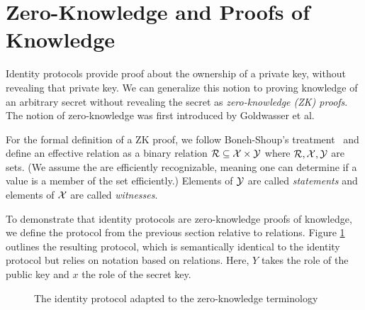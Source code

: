 \section{Zero-Knowledge and Proofs of Knowledge}
\label{sec:zknowledge}
Identity protocols provide proof about the ownership of a private key, without revealing that private key.
We can generalize this notion to proving knowledge of an arbitrary secret without revealing the secret as \emph{zero-knowledge (ZK) proofs}. 
The notion of zero-knowledge was first introduced by Goldwasser et al.~\cite{goldwasser1989knowledge}

For the formal definition of a ZK proof, we follow Boneh-Shoup's treatment~\cite{BonehShoupBook} and define an effective relation as a binary relation ${\cal R} \subseteq {\cal X} \times {\cal Y}$  where ${\cal R}, {\cal X},{\cal Y}$ are sets.
(We assume the are efficiently recognizable, meaning one can determine if a value is a member of the set efficiently.)
Elements of ${\cal Y}$ are called \emph{statements} and elements of ${\cal X}$ are called \emph{witnesses}.

To demonstrate that identity protocols are zero-knowledge proofs of knowledge, we define the protocol from the previous section relative to relations.
Figure \ref{fig:sigmaid} outlines the resulting protocol, which is semantically identical to the identity protocol but relies on notation based on relations.
Here, $Y$ takes the role of the public key and $x$ the role of the secret key.

\begin{figure}[h]
\centering


\caption{The identity protocol adapted to the zero-knowledge terminology}
\label{fig:sigmaid}
\end{figure}

